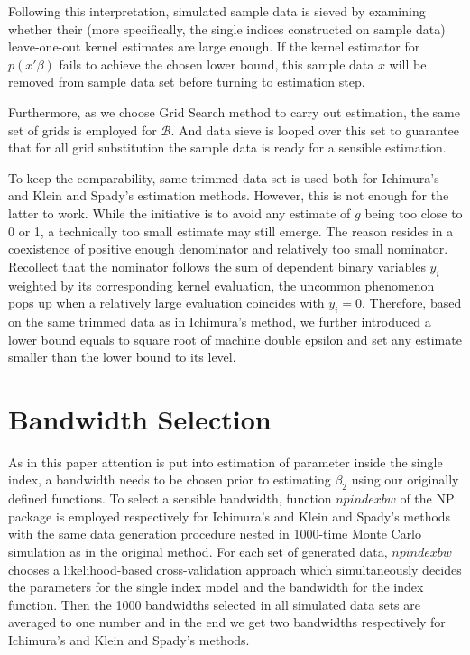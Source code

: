 \documentclass[a4paper]{article}
\begin{document}
Following this interpretation, simulated sample data is sieved by examining whether their (more specifically, the single indices constructed on sample data) leave-one-out kernel estimates are large enough. If the kernel estimator for $p(x'\beta)$ fails to achieve the chosen lower bound, this sample data $x$ will be removed from sample data set before turning to estimation step.

Furthermore, as we choose Grid Search method to carry out estimation, the same set of grids is employed for $\mathcal{B}$. And data sieve is looped over this set to guarantee that for all grid substitution the sample data is ready for a sensible estimation.

To keep the comparability, same trimmed data set is used both for Ichimura's and Klein and Spady's estimation methods. However, this is not enough for the latter to work. While the initiative is to avoid any estimate of $g$ being too close to 0 or 1, a technically too small estimate may still emerge. The reason resides in a coexistence of positive enough denominator and relatively too small nominator. Recollect that the nominator follows the sum of dependent binary variables $y_i$ weighted by its corresponding kernel evaluation, the uncommon phenomenon pops up when a relatively large evaluation coincides with $y_i = 0$. Therefore, based on the same trimmed data as in Ichimura's method, we further introduced a lower bound equals to square root of machine double epsilon and set any estimate smaller than the lower bound to its level.

\section{Bandwidth Selection}
As in this paper attention is put into estimation of parameter inside the single index, a bandwidth needs to be chosen prior to estimating $\beta_2$ using our originally defined functions. To select a sensible bandwidth, function $npindexbw$ of the NP package is employed respectively for Ichimura's and Klein and Spady's methods with the same data generation procedure nested in 1000-time Monte Carlo simulation as in the original method. For each set of generated data, $npindexbw$ chooses a likelihood-based cross-validation approach which simultaneously decides the parameters for the single index model and the bandwidth for the index function. Then the 1000 bandwidths selected in all simulated data sets are averaged to one number and in the end we get two bandwidths respectively for Ichimura's and Klein and Spady's methods.
\end{document}
